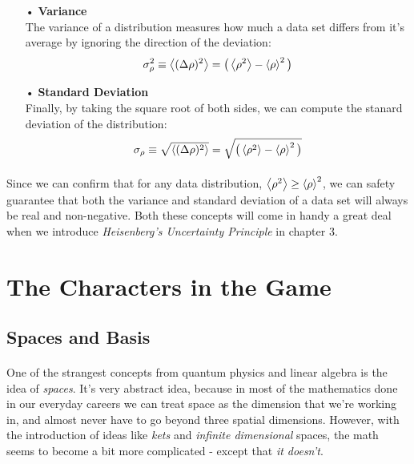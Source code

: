 \documentclass[12pt,letterpaper]{book}
\begin{document}
\begin{enumerate}
\item[•]\textbf{Variance}\\
The variance of a distribution measures how much a data set differs from it's average by ignoring the direction of the deviation:
\begin{equation}
\label{variance}
\sigma_{\rho}^2 \equiv \expval{(\Delta \rho)^2} = \big( \expval{\rho^2} - \expval{\rho}^2 \big)
\end{equation}
\item[•]\textbf{Standard Deviation}\\
Finally, by taking the square root of both sides, we can compute the stanard deviation of the distribution:
\begin{equation}
\label{std dev}
\sigma_{\rho} \equiv \sqrt{\expval{(\Delta \rho)^2}} = \sqrt{\big( \expval{\rho^2} - \expval{\rho}^2 \big)}
\end{equation}
\end{enumerate}
\paragraph*{}Since we can confirm that for any data distribution, $\expval{\rho^2} \geq \expval{\rho}^2$, we can safety guarantee that both the variance and standard deviation of a data set will always be real and non-negative. Both these concepts will come in handy a great deal when we introduce \textit{Heisenberg's Uncertainty Principle} in chapter 3.


\section{The Characters in the Game}


\subsection*{Spaces and Basis}
\paragraph*{}One of the strangest concepts from quantum physics and linear algebra is the idea of \textit{spaces}. It's very abstract idea, because in most of the mathematics done in our everyday careers we can treat space as the dimension that we're working in, and almost never have to go beyond three spatial dimensions. However, with the introduction of ideas like \textit{kets} and \textit{infinite dimensional} spaces, the math seems to become a bit more complicated - except that \textit{it doesn't}.
\end{document}
